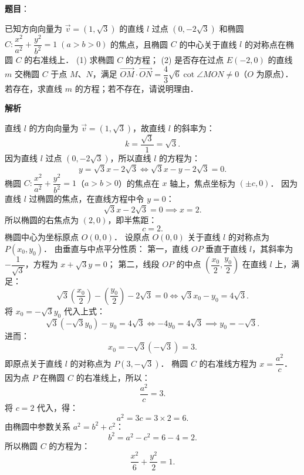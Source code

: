 \begin{answer}

\textbf{题目}：

已知方向向量为 $\vec{v} = (1, \sqrt{3})$ 的直线 $l$ 过点 $(0, -2\sqrt{3})$ 和椭圆 $C: \dfrac{x^2}{a^2} + \dfrac{y^2}{b^2} = 1 \; (a > b > 0)$ 的焦点，且椭圆 $C$ 的中心关于直线 $l$ 的对称点在椭圆 $C$ 的右准线上．
(1) 求椭圆 $C$ 的方程；
(2) 是否存在过点 $E(-2, 0)$ 的直线 $m$ 交椭圆 $C$ 于点 $M$、$N$，满足 $\overrightarrow{OM} \cdot \overrightarrow{ON} = \dfrac{4}{3}\sqrt{6}\cot\angle MON \neq 0$（$O$ 为原点）．若存在，求直线 $m$ 的方程；若不存在，请说明理由．

\textbf{解析}


直线 $l$ 的方向向量为 $\vec{v} = (1, \sqrt{3})$，故直线 $l$ 的斜率为：
\nopagebreak[4]
\[
k = \frac{\sqrt{3}}{1} = \sqrt{3}.
\]
因为直线 $l$ 过点 $(0, -2\sqrt{3})$，所以直线 $l$ 的方程为：
\nopagebreak[4]
\[
y = \sqrt{3}x - 2\sqrt{3} \iff \sqrt{3}x - y - 2\sqrt{3} = 0.
\]
椭圆 $C: \dfrac{x^2}{a^2} + \dfrac{y^2}{b^2} = 1$（$a > b > 0$）的焦点在 $x$ 轴上，焦点坐标为 $(\pm c, 0)$．
因为直线 $l$ 过椭圆的焦点，在直线方程中令 $y = 0$：
\nopagebreak[4]
\[
\sqrt{3}x - 2\sqrt{3} = 0 \implies x = 2.
\]
所以椭圆的右焦点为 $(2, 0)$，即半焦距：
\nopagebreak[4]
\[
c = 2.
\]
椭圆中心为坐标原点 $O(0, 0)$．
设原点 $O(0, 0)$ 关于直线 $l$ 的对称点为 $P(x_0, y_0)$．
由垂直与中点平分性质：
第一，直线 $OP$ 垂直于直线 $l$，其斜率为 $-\dfrac{1}{\sqrt{3}}$，方程为 $x + \sqrt{3}y = 0$；
第二，线段 $OP$ 的中点 $\left(\dfrac{x_0}{2}, \dfrac{y_0}{2}\right)$ 在直线 $l$ 上，满足：
\nopagebreak[4]
\[
\sqrt{3}\left(\frac{x_0}{2}\right) - \left(\frac{y_0}{2}\right) - 2\sqrt{3} = 0 \iff \sqrt{3}x_0 - y_0 = 4\sqrt{3}.
\]
将 $x_0 = -\sqrt{3}y_0$ 代入上式：
\nopagebreak[4]
\[
\sqrt{3}(-\sqrt{3}y_0) - y_0 = 4\sqrt{3} \iff -4y_0 = 4\sqrt{3} \implies y_0 = -\sqrt{3}.
\]
进而：
\nopagebreak[4]
\[
x_0 = -\sqrt{3}(-\sqrt{3}) = 3.
\]
即原点关于直线 $l$ 的对称点为 $P(3, -\sqrt{3})$．
椭圆 $C$ 的右准线方程为 $x = \dfrac{a^2}{c}$．
因为点 $P$ 在椭圆 $C$ 的右准线上，所以：
\nopagebreak[4]
\[
\frac{a^2}{c} = 3.
\]
将 $c = 2$ 代入，得：
\nopagebreak[4]
\[
a^2 = 3c = 3 \times 2 = 6.
\]
由椭圆中参数关系 $a^2 = b^2 + c^2$：
\nopagebreak[4]
\[
b^2 = a^2 - c^2 = 6 - 4 = 2.
\]
所以椭圆 $C$ 的方程为：
\nopagebreak[4]
\[
\frac{x^2}{6} + \frac{y^2}{2} = 1.
\]


\end{answer}
